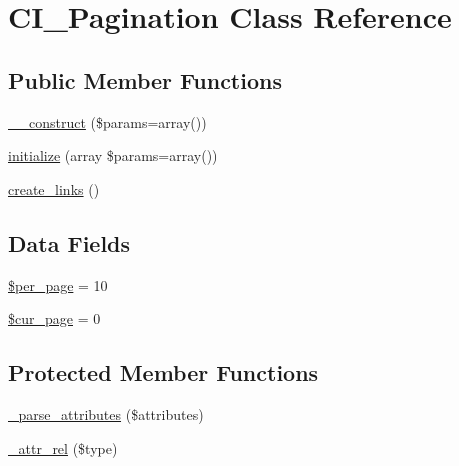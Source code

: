 \hypertarget{class_c_i___pagination}{}\section{C\+I\+\_\+\+Pagination Class Reference}
\label{class_c_i___pagination}
\subsection*{Public Member Functions}
\begin{DoxyCompactItemize}
\item 
\mbox{\hyperlink{class_c_i___pagination_a568ecdb0d73d2a870f33189739922a50}{\+\_\+\+\_\+construct}} (\$params=array())
\item 
\mbox{\hyperlink{class_c_i___pagination_a37ac2c18c8af8852be6947397aa92275}{initialize}} (array \$params=array())
\item 
\mbox{\hyperlink{class_c_i___pagination_afd580f4d296b1d416d2b4b03edef3bc5}{create\+\_\+links}} ()
\end{DoxyCompactItemize}
\subsection*{Data Fields}
\begin{DoxyCompactItemize}
\item 
\mbox{\hyperlink{class_c_i___pagination_abece0f3099457a037f8f339811dc6e20}{\$per\+\_\+page}} = 10
\item 
\mbox{\hyperlink{class_c_i___pagination_a0114271d3cbbe963a73efe317e3512c7}{\$cur\+\_\+page}} = 0
\end{DoxyCompactItemize}
\subsection*{Protected Member Functions}
\begin{DoxyCompactItemize}
\item 
\mbox{\hyperlink{class_c_i___pagination_ac8d823533e1a045a789a197373fedf0b}{\+\_\+parse\+\_\+attributes}} (\$attributes)
\item 
\mbox{\hyperlink{class_c_i___pagination_a0ebda639ff890a52b36ca5eaf27275c0}{\+\_\+attr\+\_\+rel}} (\$type)
\end{DoxyCompactItemize}
